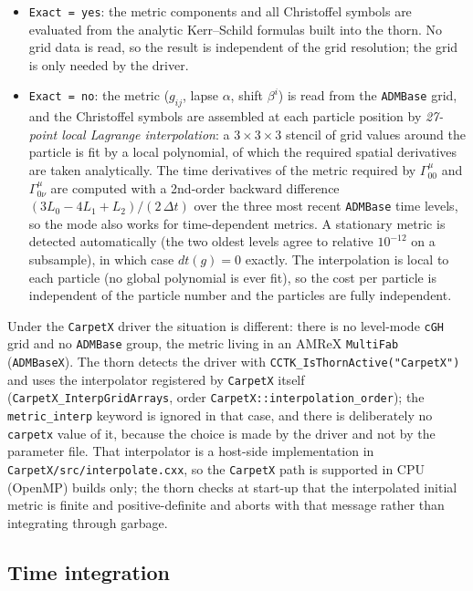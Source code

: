\documentclass{article}
\begin{document}
\begin{itemize}
\item \texttt{Exact = yes}: the metric components and all Christoffel
  symbols are evaluated from the analytic Kerr--Schild formulas built
  into the thorn.  No grid data is read, so the result is independent
  of the grid resolution; the grid is only needed by the driver.
\item \texttt{Exact = no}: the metric ($g_{ij}$, lapse $\alpha$, shift
  $\beta^i$) is read from the \texttt{ADMBase} grid, and the
  Christoffel symbols are assembled at each particle position by
  \emph{27-point local Lagrange interpolation}: a $3 \times 3 \times 3$
  stencil of grid values around the particle is fit by a local
  polynomial, of which the required spatial derivatives are taken
  analytically.  The time derivatives of the metric required by
  $\Gamma^\mu_{00}$ and $\Gamma^\mu_{0\nu}$ are computed with a
  2nd-order backward difference $(3 L_0 - 4 L_1 + L_2)/(2\,\Delta t)$
  over the three most recent \texttt{ADMBase} time levels, so the mode
  also works for time-dependent metrics.  A stationary metric is
  detected automatically (the two oldest levels agree to relative
  $10^{-12}$ on a subsample), in which case $dt(g) = 0$ exactly.
  The interpolation is local to each particle (no global polynomial is
  ever fit), so the cost per particle is independent of the particle
  number and the particles are fully independent.
\end{itemize}

Under the \texttt{CarpetX} driver the situation is different: there is no
level-mode \texttt{cGH} grid and no \texttt{ADMBase} group, the metric
living in an AMReX \texttt{MultiFab} (\texttt{ADMBaseX}).  The thorn
detects the driver with \texttt{CCTK\_IsThornActive("CarpetX")} and uses
the interpolator registered by \texttt{CarpetX} itself
(\texttt{CarpetX\_InterpGridArrays}, order
\texttt{CarpetX::interpolation\_order}); the \texttt{metric\_interp}
keyword is ignored in that case, and there is deliberately no
\texttt{carpetx} value of it, because the choice is made by the driver and
not by the parameter file.  That interpolator is a host-side
implementation in \texttt{CarpetX/src/interpolate.cxx}, so the
\texttt{CarpetX} path is supported in CPU (OpenMP) builds only; the thorn
checks at start-up that the interpolated initial metric is finite and
positive-definite and aborts with that message rather than integrating
through garbage.

\subsection{Time integration}
\end{document}
